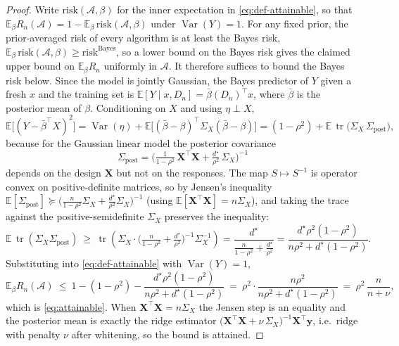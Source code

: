 \documentclass{article}
\newcommand{\E}{\mathbb{E}}
\newcommand{\Var}{\operatorname{Var}}
\newcommand{\tr}{\operatorname{tr}}
\newcommand{\Sx}{\Sigma_{X}}
\newcommand{\T}{^{\top}}
\begin{document}
\begin{proof}
Write $\mathrm{risk}(\mathcal{A},\beta)$ for the inner expectation in
\eqref{eq:def-attainable}, so that
$\E_\beta R_n(\mathcal{A}) = 1 - \E_\beta\,\mathrm{risk}(\mathcal{A},\beta)$
under $\Var(Y)=1$. For any fixed prior, the prior-averaged risk of every
algorithm is at least the Bayes risk,
$\E_\beta\,\mathrm{risk}(\mathcal{A},\beta)\ge \mathrm{risk}^{\mathrm{Bayes}}$,
so a lower bound on the Bayes risk gives the claimed upper bound on
$\E_\beta R_n$ uniformly in $\mathcal{A}$. It therefore suffices to bound the
Bayes risk below. Since the model is jointly Gaussian, the Bayes predictor of
$Y$ given a fresh $x$ and the training set is
$\E[Y\mid x,D_n]=\bar\beta(D_n)\T x$, where $\bar\beta$ is the posterior mean of
$\beta$. Conditioning on $X$ and using $\eta\perp X$,
\[
\E\big[(Y-\bar\beta\T X)^2\big]
= \Var(\eta) + \E\big[(\bar\beta-\beta)\T\Sx(\bar\beta-\beta)\big]
= (1-\rho^2) + \E\,\tr\!\big(\Sx\,\Sigma_{\mathrm{post}}\big),
\]
because for the Gaussian linear model the posterior covariance
\[
\Sigma_{\mathrm{post}}
= \Big(\tfrac{1}{1-\rho^2}\,\mathbf{X}\T\mathbf{X}
       + \tfrac{d^\star}{\rho^2}\,\Sx\Big)^{-1}
\]
depends on the design $\mathbf{X}$ but not on the responses. The map
$S\mapsto S^{-1}$ is operator convex on positive-definite matrices, so by
Jensen's inequality
$\E[\Sigma_{\mathrm{post}}]\succeq\big(\tfrac{n}{1-\rho^2}\Sx+\tfrac{d^\star}{\rho^2}\Sx\big)^{-1}$
(using $\E[\mathbf{X}\T\mathbf{X}]=n\Sx$), and taking the trace against the
positive-semidefinite $\Sx$ preserves the inequality:
\[
\E\,\tr(\Sx\Sigma_{\mathrm{post}})
\ \ge\
\tr\!\left(\Sx\cdot\Big(\tfrac{n}{1-\rho^2}+\tfrac{d^\star}{\rho^2}\Big)^{-1}\Sx^{-1}\right)
= \frac{d^\star}{\frac{n}{1-\rho^2}+\frac{d^\star}{\rho^2}}
= \frac{d^\star\rho^2(1-\rho^2)}{n\rho^2+d^\star(1-\rho^2)} .
\]
Substituting into \eqref{eq:def-attainable} with $\Var(Y)=1$,
\[
\E_\beta R_n(\mathcal{A})
\ \le\ 1-(1-\rho^2)-\frac{d^\star\rho^2(1-\rho^2)}{n\rho^2+d^\star(1-\rho^2)}
\ =\ \rho^2\cdot\frac{n\rho^2}{n\rho^2+d^\star(1-\rho^2)}
\ =\ \rho^2\,\frac{n}{n+\nu},
\]
which is \eqref{eq:attainable}. When $\mathbf{X}\T\mathbf{X}=n\Sx$ the Jensen
step is an equality and the posterior mean is exactly the ridge estimator
$\big(\mathbf{X}\T\mathbf{X}+\nu\,\Sx\big)^{-1}\mathbf{X}\T\mathbf{y}$, i.e.\
ridge with penalty $\nu$ after whitening, so the bound is attained.
\end{proof}
\end{document}
